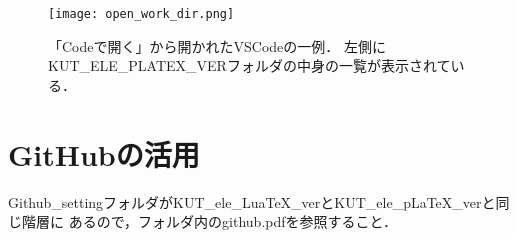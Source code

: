 \begin{figure}[tb]
  \centering
  \texttt{[image: open\_work\_dir.png]}
  \caption{
    「Codeで開く」から開かれたVSCodeの一例．
    左側にKUT\_ELE\_PLATEX\_VERフォルダの中身の一覧が表示されている．
  }
  \label{fig:open work dir}
\end{figure}

\section{GitHubの活用}
Github\_settingフォルダがKUT\_ele\_LuaTeX\_verとKUT\_ele\_pLaTeX\_verと同じ階層に
あるので，フォルダ内のgithub.pdfを参照すること．
